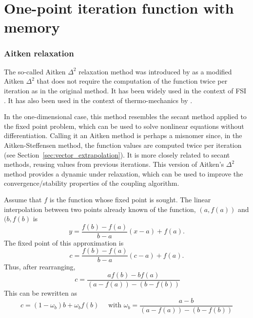\section{One-point iteration function with memory}

\subsubsection{Aitken relaxation}


The so-called Aitken \(\Delta^2\) relaxation method was introduced by \cite{irons_version_1969} as a modified Aitken \(\Delta^2\) that does not require the computation of the function twice per iteration as in the original method.
It has been widely used in the context of FSI \citep{irons_version_1969, kuttler_fixed-point_2008, joosten_analysis_2009, kuttler_vector_2009, erbts_partitioned_2015, wendt_partitioned_2015}.
It has also been used in the context of thermo-mechanics by \cite{danowski_monolithic_2013}.

In the one-dimensional case, this method resembles the secant method applied to the fixed point problem, which can be used to solve nonlinear equations without differentiation.
Calling it an Aitken method is perhaps a misnomer since, in the Aitken-Steffensen method, the function values are computed twice per iteration (see Section~\ref{sec:vector_extrapolation}).
It is more closely related to secant methods, reusing values from previous iterations.
This version of Aitken's \(\Delta^2\) method provides a dynamic under relaxation, which can be used to improve the convergence/stability properties of the coupling algorithm.

Assume that \(f\) is the function whose fixed point is sought.
The linear interpolation between two points already known of the function, \((a, f(a))\) and \((b, f(b)\) is
\begin{equation}
  y = \frac{f(b)-f(a)}{b-a}(x-a) + f(a).
\end{equation}
The fixed point of this approximation is
\begin{equation}
  c = \frac{f(b)-f(a)}{b-a}(c-a) + f(a).
\end{equation}
Thus, after rearranging,
\begin{equation}\
c=\frac{a f(b)- b f(a)}{\left(a-f(a)\right)-\left(b-f(b)\right)}
\end{equation}
This can be rewritten as
\begin{equation}
c=\left(1-\omega_{b}\right) b+\omega_{b} f(b) \quad \text { with } \omega_{b}=\frac{a-b}{\left(a-f(a)\right)-\left(b-f(b)\right)}
\end{equation}

